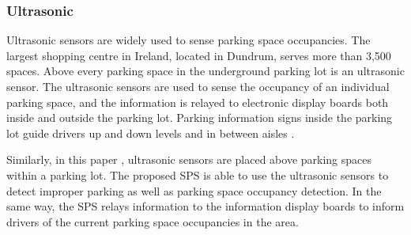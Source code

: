 \subsubsection*{Ultrasonic}
Ultrasonic sensors are widely used to sense parking space occupancies. The largest shopping centre in Ireland, located in Dundrum, serves more than 3,500 spaces. Above every parking space in the underground parking lot is an ultrasonic sensor. The ultrasonic sensors are used to sense the occupancy of an individual parking space, and the information is relayed to electronic display boards both inside and outside the parking lot. Parking information signs inside the parking lot guide drivers up and down levels and in between aisles \citep{2008BAY-SPECIFICCENTRE}. 

Similarly, in this paper \citep{Kianpisheh2012SmartDetector}, ultrasonic sensors are placed above parking spaces within a parking lot. The proposed \ac{SPS} is able to use the ultrasonic sensors to detect improper parking as well as parking space occupancy detection. In the same way, the \ac{SPS} relays information to the information display boards to inform drivers of the current parking space occupancies in the area.